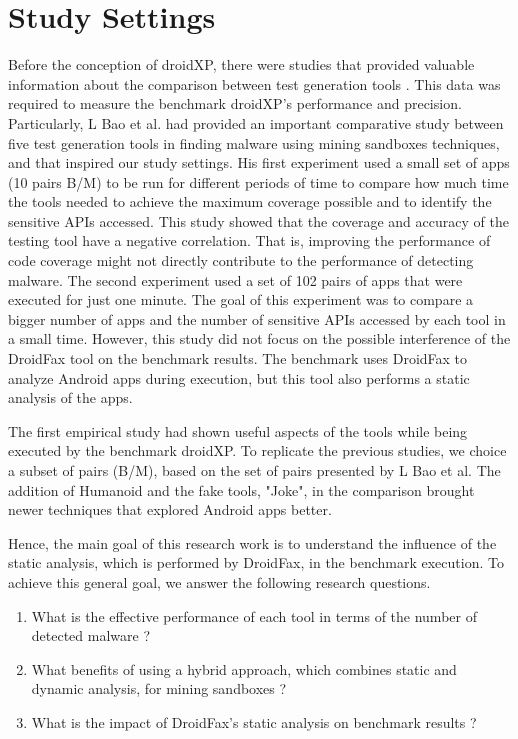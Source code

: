 \section{Study Settings}

Before the conception of droidXP, there were studies that provided valuable information about the comparison between test generation tools \cite{bao2018mining}\cite{hao2014puma}. This data was required to measure the benchmark droidXP's performance and precision. Particularly, L Bao et al. \cite{bao2018mining} had provided an important comparative study between five test generation tools in finding malware using mining sandboxes techniques, and that inspired our study settings. His first experiment used a small set of apps (10 pairs B/M) to be run for different periods of time to compare how much time the tools needed to achieve the maximum coverage possible and to identify the sensitive APIs accessed. This study showed that the coverage and accuracy of the testing tool have a negative correlation. That is, improving the performance of code coverage might not directly contribute to the performance of detecting malware. The second experiment used a set of 102 pairs of apps that were executed for just one minute. The goal of this experiment was to compare a bigger number of apps and the number of sensitive APIs accessed by each tool in a small time. However, this study did not focus on the possible interference of the DroidFax \cite{cai2017droidfax} tool on the benchmark results. The benchmark uses DroidFax to analyze Android apps during execution, but this tool also performs a static analysis of the apps.

The first empirical study had shown useful aspects of the tools while being executed by the benchmark droidXP. To replicate the previous studies, we choice a subset of pairs (B/M), based on the set of pairs presented by L Bao et al. The addition of Humanoid and the fake tools, "Joke", in the comparison brought newer techniques that explored Android apps better.

Hence, the main goal of this research work is
to understand the influence of the static analysis, which is performed by DroidFax, in the benchmark execution. To achieve this general goal, we answer the following research questions. 


\begin{enumerate}[(RQ1)]
\item What is the effective performance of each tool in terms of the number of detected malware ?
\item What benefits of using a hybrid approach, which combines static and dynamic analysis, for mining sandboxes ?
\item What is the impact of DroidFax’s static analysis on benchmark results ?
\end{enumerate}

